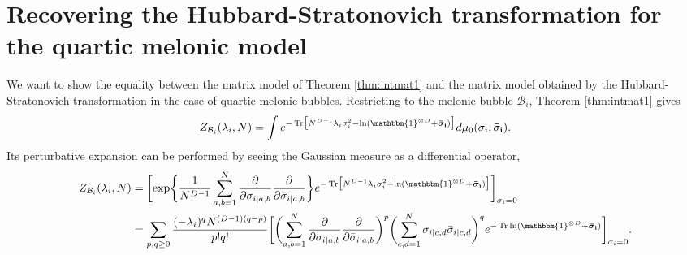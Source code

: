 \documentclass[aps,prd,10pt,notitlepage,nofootinbib,superscriptaddress,showkeys,showpacs]{revtex4-1}
\begin{document}
\section{Recovering the Hubbard-Stratonovich transformation for the quartic melonic model}
\label{HubStrat}

We want to show the equality between the matrix model of Theorem \ref{thm:intmat1} and the matrix model \cite{BeyondPert} obtained by the Hubbard-Stratonovich transformation in the case of quartic melonic bubbles. Restricting to the melonic bubble ${\mathcal{B}}_i$, Theorem \ref{thm:intmat1} gives
\begin{equation}
\label{eqref:ZQuartMel}
 Z_{{\mathcal{B}}_i}(\lambda_i, N)
=\int e^{ -  \operatorname{Tr}\bigl[ {N^{D-1}}\lambda_i\sigma_i^2-\ln({\mathbbm{1}}^{\otimes D}+{\bf \bar {\bm{\sigma}} _i})  \bigr]}d\mu_{0}(\sigma_i,{\bf \bar  \sigma_i}).
\end{equation}
Its perturbative expansion can be performed by seeing the Gaussian measure as a differential operator,
\begin{align}
Z_{{\mathcal{B}}_i}(\lambda_i, N)
&=\biggl[ \exp\biggl\{ \frac{1}{N^{D-1}}\sum_{a,b=1}^N\frac{\partial}{\partial\sigma_{i\mid a,b}}\frac{\partial}{\partial\bar\sigma_{i\mid a,b}}  \biggr\}     e^{ -  \operatorname{Tr}\bigl[ {N^{D-1}} \lambda_i\sigma_i^2-\ln({\mathbbm{1}}^{\otimes D}+{\bf \bar {\bm{\sigma}} _i})  \bigr]}\biggr]_{\sigma_i=0}\\
&
\label{eqref:ExprZ}
=\sum_{p,q\ge0} \frac{(-\lambda_i)^qN^{(D-1)(q-p)}}{p!q!}
\biggl[\biggl( \sum_{a,b=1}^N\frac{\partial}{\partial\sigma_{i\mid a,b}}\frac{\partial}{\partial\bar\sigma_{i\mid a,b}}  \biggr)^p     \biggl( \sum_{c,d=1}^N\sigma_{i\mid c,d}\bar\sigma_{i\mid c,d}\biggr)^q e^{-\operatorname{Tr}\ln({\mathbbm{1}}^{\otimes D}+{\bf \bar {\bm{\sigma}} _i})  }\biggr]_{\sigma_i=0}.
\end{align}
\end{document}
